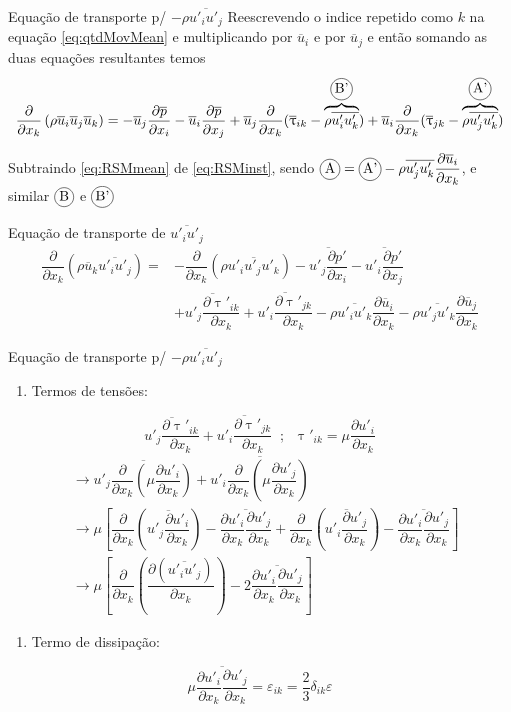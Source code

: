 \documentclass[10pt]{beamer}
\newcommand{\ddx}[2]{\dfrac{\partial #1}{\partial x_{#2}}}
\newcommand{\ddxp}[2]{\dfrac{\partial }{\partial x_{#2}}\left(#1\right)}
\newcommand{\m}[1]{\overline{#1}}
\newcommand{\incircle}[1]{{\tikz[baseline=(X.base)] \node(X)[draw, shape=circle, inner sep=0]{\strut #1};}}
\begin{document}
\begin{frame}{Equação de transporte p/ $ -\rho \m{u'_i u'_j} $}
	Reescrevendo o indice repetido como $k$ na equação \ref{eq:qtdMovMean} e multiplicando por $ \m{u}_i $ e por $ \m{u}_j $ e então somando as duas equações resultantes temos
	\begin{equation}\label{eq:RSMmean}
	\ddxp{\rho \m{u}_i \m{u}_j \m{u}_k}{k} = - \m{u}_j \ddx{\m{p}}{i} - \m{u}_i \ddx{\m{p}}{j} + \m{u}_j \ddx{}{k}(\m{\uptau}_{ik} - \overbrace{\rho\m{u'_iu'_k}}^{\incircle{B'}}) + \m{u}_i \ddx{}{k}(\m{\uptau}_{jk} - \overbrace{\rho\m{u'_ju'_k}}^{\incircle{A'}})
	\end{equation}
	
	Subtraindo \ref{eq:RSMmean} de \ref{eq:RSMinst}, sendo $\incircle{A} = \incircle{A'} - \rho \m{u'_ju'_k}\ddx{\m{u}_i}{k}$, e similar $\incircle{B} $ e $ \incircle{B'} $
	
	\begin{block}{Equação de transporte de $ \m{u'_i u'_j} $}
		\begin{align}\label{eq:uiuj}
	\ddxp{\rho \m{u}_k \m{u'_i u'_j}}{k} = &- \ddxp{\rho \m{u'_iu'_ju'_k}}{k} - \m{u'_j\ddx{p'}{i}} - \m{u'_i\ddx{p'}{j}} \nonumber \\
	&+ \m{u'_j\ddx{\uptau'_{ik}}{k}} + \m{u'_i\ddx{\uptau'_{jk}}{k}}
	- \rho \m{u'_i u'_k} \ddx{\m{u}_i}{k} - \rho \m{u'_j u'_k} \ddx{\m{u}_j}{k} 
	\end{align}
	\end{block}
		
\end{frame}

\begin{frame}{Equação de transporte p/ $ -\rho \m{u'_i u'_j} $}
	
	\begin{enumerate}[$\bullet$]
		\item Termos de tensões:
	\end{enumerate}
	
	\begin{equation*}
	\m{u'_j\ddx{\uptau'_{ik}}{k}} + \m{u'_i\ddx{\uptau'_{jk}}{k}} \;\;;\;\; \uptau'_{ik} = \mu \ddx{u'_i}{k}
	\end{equation*}
	\begin{align*}
	&\rightarrow \m{u'_j\ddxp{\mu \ddx{u'_i}{k}}{k}} + \m{u'_i\ddxp{\mu \ddx{u'_j}{k}}{k}} \\
	&\rightarrow \mu \left[ \ddxp{\m{u'_j \ddx{u'_i}{k}}}{k} - \m{\ddx{u'_i}{k}\ddx{u'_j}{k}} + \ddxp{\m{u'_i \ddx{u'_j}{k}}}{k} - \m{\ddx{u'_i}{k}\ddx{u'_j}{k}} \right] \\
	&\rightarrow \mu \left[ \ddxp{\ddx{(\m{u'_iu'_j})}{k}}{k} - 2 \m{\ddx{u'_i}{k}\ddx{u'_j}{k}} \right]
	\end{align*}
	
	\begin{enumerate}[$\bullet$]
		\item Termo de dissipação:
	\end{enumerate}
	\begin{equation*}
	\mu \m{\ddx{u'_i}{k}\ddx{u'_j}{k}} = \varepsilon_{ik} = \dfrac{2}{3} \delta_{ik}\varepsilon
	\end{equation*}
	
	
\end{frame}
\end{document}
